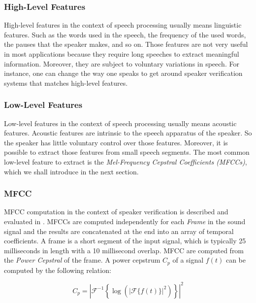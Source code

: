 \documentclass[twocolumn]{article}
\begin{document}
\subsubsection{High-Level Features}

High-level features in the context of speech processing usually means
linguistic features. Such as the words used in the speech, the frequency of the
used words, the pauses that the speaker makes, and so on. Those features are
not very useful in most applications because they require long speeches to
extract meaningful information. Moreover, they are subject to voluntary
variations in speech. For instance, one can change the way one speaks to get
around speaker verification systems that matches high-level features.

\subsubsection{Low-Level Features}

Low-level features in the context of speech processing usually means acoustic
features. Acoustic features are intrinsic to the speech apparatus of the
speaker. So the speaker has little voluntary control over those features.
Moreover, it is possible to extract those features from small speech segments.
The most common low-level feature to extract is the \emph{Mel-Frequency
Cepstral Coefficients (MFCCs)}, which we shall introduce in the next section.

\subsubsection{MFCC}

MFCC computation in the context of speaker verification is described and
evaluated in \autocite{Sahidullah2012}. MFCCs are computed independently for
each \emph{Frame} in the sound signal and the results are  concatenated at the
end into an array of temporal coefficients. A frame is a short segment of the
input signal, which is typically 25 milliseconds in length with a 10
millisecond overlap. MFCC are computed from the \emph{Power Cepstral} of the
frame. A power cepstrum $C_{p}$ of a signal $f(t)$ can be computed by the
following relation:

\begin{equation}
C_{p} = \left|{\mathcal{F}}^{-1}\left\{
        \log\left(\left|{\mathcal{F}}\{f(t)\}\right|^{2}\right)
        \right\}\right|^{2}
\end{equation}
\end{document}
